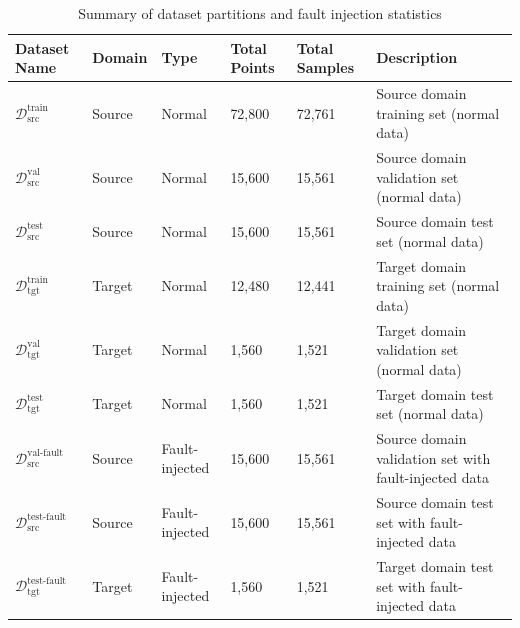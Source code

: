 \documentclass[a4paper,10pt]{cas-sc}%
\newcommand{\roundtworev}[1]{\textcolor{roundtwored}{#1}}
\begin{document}
\begin{table}[pos=htbp]
	\centering
	\caption{Summary of dataset partitions and fault injection statistics}
	\label{tab:dataset_sample_fault_summary}
	\renewcommand{\arraystretch}{1.2}
	\begin{tabular}{lllllp{5.2cm}<{\raggedright\arraybackslash}}
		\toprule
 \textbf{Dataset Name} & \textbf{Domain} & \textbf{Type} & \textbf{Total Points} & \textbf{Total Samples} & \textbf{Description} \\
		\midrule
		\( \mathcal{D}_{\text{src}}^{\text{train}} \)      & Source          & Normal         & 72,800                & 72,761                 & Source domain training set (normal data)              \\
		\( \mathcal{D}_{\text{src}}^{\text{val}} \)        & Source          & Normal         & 15,600                & 15,561                 & Source domain validation set (normal data)            \\
		\( \mathcal{D}_{\text{src}}^{\text{test}} \)       & Source          & Normal         & 15,600                & 15,561                 & Source domain test set (normal data)                  \\
		\( \mathcal{D}_{\text{tgt}}^{\text{train}} \)      & Target          & Normal         & 12,480                & 12,441                 & Target domain training set (normal data)              \\
		\roundtworev{\( \mathcal{D}_{\text{tgt}}^{\text{val}} \)} & \roundtworev{Target} & \roundtworev{Normal} & \roundtworev{1,560} & \roundtworev{1,521} & \roundtworev{Target domain validation set (normal data)} \\
		\( \mathcal{D}_{\text{tgt}}^{\text{test}} \)       & Target          & Normal         & 1,560                 & 1,521                  & Target domain test set (normal data)                  \\
		\midrule
		\( \mathcal{D}_{\text{src}}^{\text{val-fault}} \)  & Source          & Fault-injected & 15,600                & 15,561                 & Source domain validation set with fault-injected data \\
		\( \mathcal{D}_{\text{src}}^{\text{test-fault}} \) & Source          & Fault-injected & 15,600                & 15,561                 & Source domain test set with fault-injected data       \\
		\( \mathcal{D}_{\text{tgt}}^{\text{test-fault}} \) & Target          & Fault-injected & 1,560                 & 1,521                  & Target domain test set with fault-injected data       \\
		\bottomrule
	\end{tabular}
\end{table}
\end{document}
